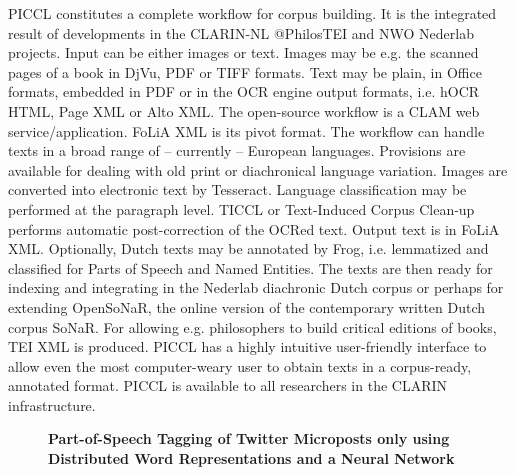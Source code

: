 \documentclass[10pt, a4paper, twopage, headinclude, footinclude, BCOR5mm]{book}
\begin{document}
\begin{table}[t!]
\end{table} 
\noindent
PICCL constitutes a complete workflow for corpus building. It is the integrated result of developments in the CLARIN-NL @PhilosTEI and NWO Nederlab projects.  Input can be either images or text. Images may be e.g. the scanned pages of a book in DjVu, PDF or TIFF formats. Text may be plain, in Office formats, embedded in PDF or in the OCR engine output formats, i.e. hOCR HTML, Page XML or Alto XML.  The open-source workflow is a CLAM web service/application. FoLiA XML is its pivot format.  The workflow can handle texts in a broad range of -- currently -- European languages. Provisions are available for dealing with old print or diachronical language variation.  Images are converted into electronic text by Tesseract. Language classification may be performed at the paragraph level. TICCL or Text-Induced Corpus Clean-up performs automatic post-correction of the OCRed text.   Output text is in FoLiA XML. Optionally, Dutch texts may be annotated by Frog, i.e. lemmatized and classified for Parts of Speech and Named Entities. The texts are then ready for indexing and integrating in the Nederlab diachronic Dutch corpus or perhaps for extending OpenSoNaR, the online version of the contemporary written Dutch corpus SoNaR. For allowing e.g. philosophers to build critical editions of books, TEI XML is produced.  PICCL has a highly intuitive user-friendly interface to allow even the most computer-weary user to obtain texts in a corpus-ready, annotated format.   PICCL is available to all researchers in the CLARIN infrastructure.  

\newpage

\begin{figure}[t!]
\centering
\large\textbf{Part-of-Speech Tagging of Twitter Microposts only using Distributed Word Representations and a Neural Network}
\vspace*{0.5cm}
\end{figure}
\end{document}
